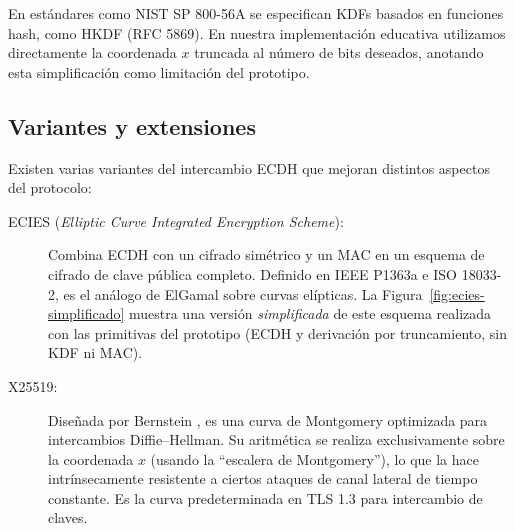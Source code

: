 En estándares como NIST SP 800-56A \cite{nist-sp800-56a} se especifican KDFs basados en funciones hash, como HKDF (RFC 5869). En nuestra implementación educativa utilizamos directamente la coordenada $x$ truncada al número de bits deseados, anotando esta simplificación como limitación del prototipo.


\subsection{Variantes y extensiones}
\label{subsec:ecdh-variantes}

Existen varias variantes del intercambio ECDH que mejoran distintos aspectos del protocolo:

\begin{description}
    \item[ECIES (\textit{Elliptic Curve Integrated Encryption Scheme}):] Combina ECDH con un cifrado simétrico y un MAC en un esquema de cifrado de clave pública completo. Definido en IEEE P1363a e ISO 18033-2, es el análogo de ElGamal sobre curvas elípticas. La Figura~\ref{fig:ecies-simplificado} muestra una versión \emph{simplificada} de este esquema realizada con las primitivas del prototipo (ECDH y derivación por truncamiento, sin KDF ni MAC).
    
    \item[X25519:] Diseñada por Bernstein \cite{bernstein2006curve25519}, es una curva de Montgomery optimizada para intercambios Diffie--Hellman. Su aritmética se realiza exclusivamente sobre la coordenada $x$ (usando la ``escalera de Montgomery''), lo que la hace intrínsecamente resistente a ciertos ataques de canal lateral de tiempo constante. Es la curva predeterminada en TLS 1.3 para intercambio de claves.
\end{description}

